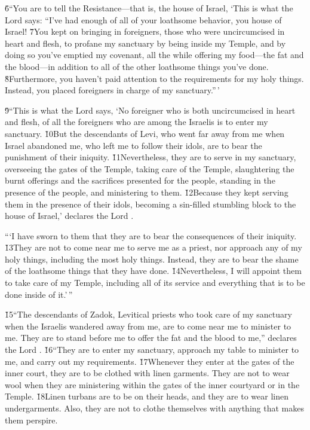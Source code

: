 \v{6}``You are to tell the Resistance---that is, the house of Israel, `This is what the Lord  says: ``I've had enough of all of your loathsome behavior, you house of Israel! \v{7}You kept on bringing in foreigners, those who were uncircumcised in heart and flesh, to profane my sanctuary by being inside my Temple, and by doing so you've emptied my covenant, all the while offering my food---the fat and the blood---in addition to all of the other loathsome things you've done. \v{8}Furthermore, you haven't paid attention to the requirements for my holy things. Instead, you placed foreigners in charge of my sanctuary.''\,'

\v{9}``This is what the Lord  says, `No foreigner who is both uncircumcised in heart and flesh, of all the foreigners who are among the Israelis is to enter my sanctuary. \v{10}But the descendants of Levi, who went far away from me when Israel abandoned me, who left me to follow their idols, are to bear the punishment of their iniquity. \v{11}Nevertheless, they are to serve in my sanctuary, overseeing the gates of the Temple, taking care of the Temple, slaughtering the burnt offerings and the sacrifices presented for the people, standing in the presence of the people, and ministering to them. \v{12}Because they kept serving them in the presence of their idols, becoming a sin-filled stumbling block to the house of Israel,' declares the Lord .

```I have sworn to them that they are to bear the consequences of their iniquity. \v{13}They are not to come near me to serve me as a priest, nor approach any of my holy things, including the most holy things. Instead, they are to bear the shame of the loathsome things that they have done. \v{14}Nevertheless, I will appoint them to take care of my Temple, including all of its service and everything that is to be done inside of it.'\,''

\v{15}``The descendants of Zadok, Levitical priests who took care of my sanctuary when the Israelis wandered away from me, are to come near me to minister to me. They are to stand before me to offer the fat and the blood to me,'' declares the Lord . \v{16}``They are to enter my sanctuary, approach my table to minister to me, and carry out my requirements. \v{17}Whenever they enter at the gates of the inner court, they are to be clothed with linen garments. They are not to wear wool when they are ministering within the gates of the inner courtyard or in the Temple. \v{18}Linen turbans are to be on their heads, and they are to wear linen undergarments. Also, they are not to clothe themselves with anything that makes them perspire.

